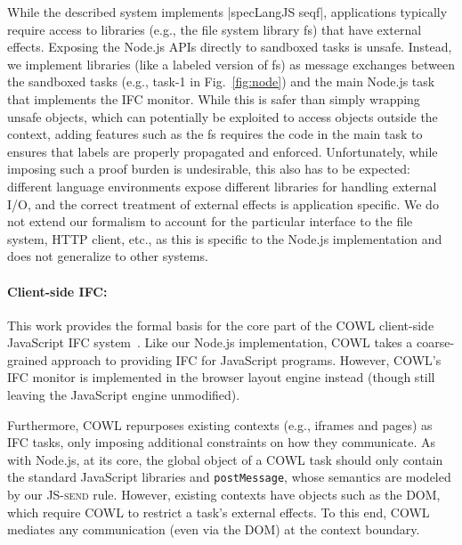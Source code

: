 While the described system implements |specLangJS seqf|, applications
typically require access to libraries (e.g., the file system library
\textsf{fs}) that have external effects.
%
Exposing the Node.js APIs directly to sandboxed tasks is unsafe.
Instead, we implement libraries (like a labeled version of \textsf{fs}) as
message exchanges between the sandboxed tasks (e.g., \textsf{task-1}
in Fig.~\ref{fig:node}) and the main Node.js task that implements
the IFC monitor.
%
While this is safer than simply wrapping unsafe objects, which can
potentially be exploited to access objects outside the context, adding
features such as the \textsf{fs} requires the code in the main task to
ensures that labels are properly propagated and enforced.
%
Unfortunately, while imposing such a proof burden
is undesirable, this also has to be expected:
different language environments expose different libraries for
handling external I/O, and the correct treatment of external effects
is application specific.
%
%
%
We do not extend our formalism to account for the  particular
interface to the file system, HTTP client, etc., as this is
specific to the Node.js implementation and does not generalize
to other systems.


\paragraph{Client-side IFC:}
This work provides the formal basis for the core part of the COWL
client-side JavaScript IFC system~\cite{swapi}.
%
Like our Node.js implementation, COWL takes a coarse-grained approach
to providing IFC for JavaScript programs.
%
However, COWL's IFC monitor is implemented in
the browser layout engine instead (though still leaving the JavaScript engine
unmodified).

Furthermore, COWL repurposes existing contexts (e.g., iframes and
pages) as IFC tasks, only imposing additional constraints on how they
communicate.
%
As with Node.js, at its core, the global object of a COWL task
should only contain the standard JavaScript libraries and
\texttt{postMessage}, whose semantics are modeled by our
\textsc{JS-send} rule.
%
However, existing contexts have objects such as the DOM, which
require COWL to restrict a task's external effects.
%
To this end, COWL mediates any communication (even via the DOM) at
the context boundary. %

